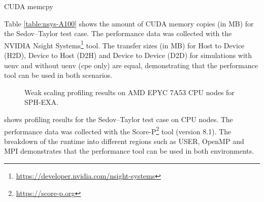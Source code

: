 \begin{table}[htp!]
    \centering
    \caption{CUDA memcpy}
    \label{table:nsys-A100}
\end{table}

Table \ref{table:nsys-A100} shows the amount of CUDA memory copies (in MB) for the Sedov--Taylor test case.
The performance data was collected with the NVIDIA {Nsight Systems\footnote{\url{https://developer.nvidia.com/nsight-systems}}}  tool.
The transfer sizes (in MB) for Host to Device (H2D), Device to Host (D2H) and Device to Device (D2D) for simulations with uenv and without uenv (cpe only) are equal, demonstrating that the performance tool can be used in both scenarios.

\begin{figure}[htp!]
    \begin{center}
        
    \end{center}
    \caption{Weak scaling profiling results on AMD EPYC 7A53 CPU nodes for SPH-EXA.}
    \label{fig:sph-weak-scorep}
\end{figure}

 shows profiling results for the Sedov--Taylor test case on CPU nodes.
The performance data was collected with the Score-P\footnote{\url{https://score-p.org}} tool (version 8.1).
The breakdown of the runtime into different regions such as USER, OpenMP and MPI demonstrates that the performance tool can be used in both environments.


